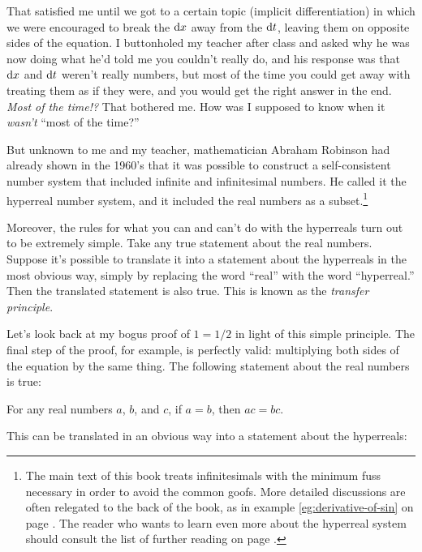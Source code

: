 That satisfied me until we got to a certain topic
(implicit differentiation) in which we were encouraged to break the $\textup{d} x$ away from the $\textup{d} t$, leaving them on
opposite sides of the equation. I buttonholed my teacher after class and asked why he was now doing what he'd
told me you couldn't really do, and his response was that $\textup{d} x$ and $\textup{d} t$ weren't really numbers,
but most of the time you could get away with treating them as if they were, and you would get the right
answer in the end. \emph{Most of the time!?} That bothered me. How was I supposed to know when it \emph{wasn't}
``most of the time?''


But unknown to me and my teacher, mathematician Abraham Robinson
had already shown in the 1960's that it
was possible to construct a self-consistent number system that included infinite and infinitesimal numbers.
He called it the hyperreal number system,
and it included the real numbers as a subset.\footnote{The main text of this book treats infinitesimals
with the minimum fuss necessary in order to avoid the common goofs. More detailed
discussions are often relegated to the back of the book, as in example \ref{eg:derivative-of-sin} on page \pageref{eg:derivative-of-sin}.
The reader who
wants to learn even more about the hyperreal system should consult the list of further reading on page \pageref{ch:further-reading}.
}

Moreover, the
rules for what you can and can't do with the hyperreals turn out to be extremely simple. 
Take any true statement about the real numbers. Suppose it's possible to translate it into a statement about
the hyperreals in the most obvious way, simply by replacing the word ``real'' with the word ``hyperreal.''
Then the translated statement is also true. This is known as the \emph{transfer principle}.

Let's look back at my bogus proof of $1=1/2$ in light of this simple principle. The final step of the proof,
for example, is perfectly valid: multiplying both sides of the equation by the same thing. The following
statement about the real numbers is true:

\begin{indentedblock}
For any real numbers $a$, $b$, and $c$, if $a=b$, then $ac=bc$.
\end{indentedblock}

This can be translated in an obvious way into a statement about the hyperreals:


